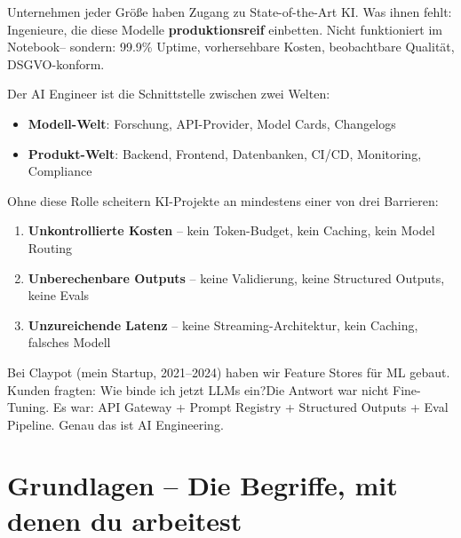 \par\mbox{}\par
\begin{realitycheckEnv}
Unternehmen jeder Größe haben Zugang zu State-of-the-Art KI. Was ihnen fehlt: Ingenieure, die diese Modelle \textbf{produktionsreif} einbetten. Nicht \glqq funktioniert im Notebook\grqq -- sondern: 99.9\% Uptime, vorhersehbare Kosten, beobachtbare Qualität, DSGVO-konform.
\end{realitycheckEnv}

Der AI Engineer ist die Schnittstelle zwischen zwei Welten:
\begin{itemize}
    \item \textbf{Modell-Welt}: Forschung, API-Provider, Model Cards, Changelogs
    \item \textbf{Produkt-Welt}: Backend, Frontend, Datenbanken, CI/CD, Monitoring, Compliance
\end{itemize}

Ohne diese Rolle scheitern KI-Projekte an mindestens einer von drei Barrieren:
\begin{enumerate}
    \item \textbf{Unkontrollierte Kosten} -- kein Token-Budget, kein Caching, kein Model Routing
    \item \textbf{Unberechenbare Outputs} -- keine Validierung, keine Structured Outputs, keine Evals
    \item \textbf{Unzureichende Latenz} -- keine Streaming-Architektur, kein Caching, falsches Modell
\end{enumerate}




\par\mbox{}\par
\begin{AUTORnotizEnv}
Bei Claypot (mein Startup, 2021--2024) haben wir Feature Stores für ML gebaut.
Kunden fragten: \glqq Wie binde ich jetzt LLMs ein?\grqq Die Antwort war nicht \glqq Fine-Tuning\grqq.
Es war: API Gateway + Prompt Registry + Structured Outputs + Eval Pipeline.
Genau das ist AI Engineering.
\end{AUTORnotizEnv}

\section{Grundlagen -- Die Begriffe, mit denen du arbeitest}

